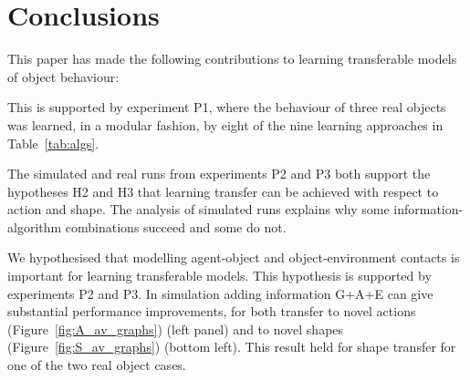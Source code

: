 
\section{Conclusions}\label{sec:Discussion}

This paper has made the following contributions to learning transferable models of object behaviour:

 This is supported by experiment P1, where the behaviour of three real objects was learned, in a modular fashion, by eight of the nine learning approaches in Table~\ref{tab:algs}. 

 The simulated and real runs from experiments P2 and P3 both support the hypotheses H2  and H3 that learning transfer can be achieved with respect to action and shape. The analysis of simulated runs explains why some information-algorithm combinations succeed and some do not. 

 We hypothesised that modelling agent-object and object-environment contacts is important for learning transferable models. This hypothesis is supported by experiments P2 and P3. In simulation adding information G+A+E can give substantial performance improvements, for both transfer to novel actions (Figure~\ref{fig:A_av_graphs}) (left panel) and to novel shapes (Figure~\ref{fig:S_av_graphs}) (bottom left).  This result held for shape transfer for one of the two real object cases. 

